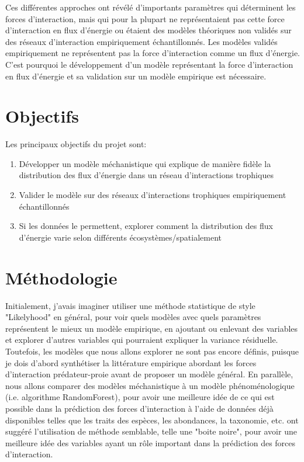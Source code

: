 \documentclass[12pt]{article}
\begin{document}
Ces différentes approches ont révélé d'importants paramètres qui déterminent les forces d'interaction, mais qui pour la plupart ne représentaient pas cette force d'interaction en flux d'énergie ou étaient des modèles théoriques non validés sur des réseaux d'interaction empiriquement échantillonnés. Les modèles validés empiriquement ne représentent pas la force d'interaction comme un flux d'énergie. C'est pourquoi le développement d'un modèle représentant la force d'interaction en flux d'énergie et sa validation sur un modèle empirique est nécessaire.


\section{Objectifs}
Les principaux objectifs du projet sont:
\begin{enumerate}
    \item Développer un modèle méchanistique qui explique de manière fidèle la distribution des flux d'énergie dans un réseau d'interactions trophiques
    \item Valider le modèle sur des réseaux d'interactions trophiques empiriquement échantillonnés 
    \item Si les données le permettent, explorer comment la distribution des flux d'énergie varie selon différents écosystèmes/spatialement
\end{enumerate}

\section{Méthodologie}
Initialement, j'avais imaginer utiliser une méthode statistique de style "Likelyhood" en général, pour voir quels modèles avec quels paramètres représentent le mieux un modèle empirique, en ajoutant ou enlevant des variables et explorer d'autres variables qui pourraient expliquer la variance résiduelle. Toutefois,
les modèles que nous allons explorer ne sont pas encore définis, puisque je dois d'abord synthétiser la littérature empirique abordant les forces d'interaction prédateur-proie avant de proposer un modèle général. En parallèle, nous allons comparer des modèles méchanistique à un modèle phénoménologique (i.e. algorithme RandomForest), pour avoir une meilleure idée de ce qui est possible dans la prédiction des forces d'interaction à l'aide de données déjà disponibles telles que les traits des espèces, les abondances, la taxonomie, etc. \citet{Brose2019PreTra} ont suggéré l'utilisation de méthode semblable, telle une "boite noire", pour avoir une meilleure idée des variables ayant un rôle important dans la prédiction des forces d'interaction.\\
\end{document}
